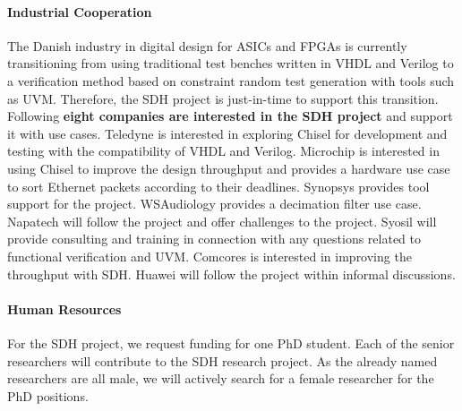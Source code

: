 \documentclass[fleqn,12pt]{article}
\begin{document}
\paragraph*{Industrial Cooperation}

The Danish industry in digital design for ASICs and FPGAs is currently transitioning from using traditional
test benches written in VHDL and Verilog to a verification method based on constraint random
test generation with tools such as UVM. Therefore, the SDH project is just-in-time to support this
transition.
%
Following {\bf eight companies are interested in the SDH project} and support it with use cases.
Teledyne is interested in exploring Chisel for development and testing with the compatibility of VHDL and Verilog.
Microchip is interested in using Chisel to improve the design throughput and
provides a hardware use case to sort Ethernet packets according to their deadlines.
Synopsys provides tool support for the project.
WSAudiology provides a decimation filter use case.
Napatech will follow the project and offer challenges to the project.
Syosil will provide consulting and training in connection with any questions related to functional verification and UVM.
Comcores is interested in improving the throughput with SDH.
Huawei will follow the project within informal discussions.


%

\paragraph*{Human Resources}

For the SDH project, we request funding for one PhD student.
Each of the senior researchers will contribute to the SDH research project.
%
%
As the already named researchers are all male, we will actively search
for a female researcher for the PhD positions.
\end{document}
